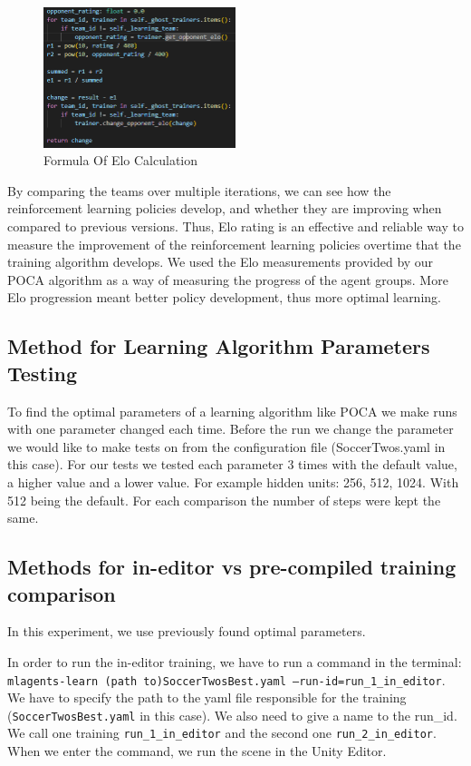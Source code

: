 \documentclass{LSkill}
\begin{document}
\begin{figure}[htbp]
    \centering
    \includegraphics[width=0.5\textwidth]{figure 1.png} 
    \caption{Formula Of Elo Calculation}
    \label{fig:Formula Of Elo Calculation}
\end{figure}
By comparing the teams over multiple iterations, we can see how the reinforcement learning policies develop, and whether they are improving when compared to previous versions. Thus, Elo rating is an effective and reliable way to measure the improvement of the reinforcement learning policies overtime that the training algorithm develops. 
We used the Elo measurements provided by our POCA algorithm as a way of measuring the progress of the agent groups. More Elo progression meant better policy development, thus more optimal learning. 



\subsection{Method for Learning Algorithm Parameters Testing}
To find the optimal parameters of a learning algorithm like POCA we make runs with one parameter changed each time. Before the run we change the parameter we would like to make tests on from the configuration file (SoccerTwos.yaml in this case). For our tests we tested each parameter 3 times with the default value, a higher value and a lower value. For example hidden units:  256,  512,  1024. With 512 being the default. For each comparison the number of steps were kept the same.

\subsection{Methods for in-editor vs pre-compiled training comparison}
In this experiment, we use previously found optimal parameters.

In order to run the in-editor training, we have to run a command in the terminal: 
\texttt{mlagents-learn (path to)SoccerTwosBest.yaml --run-id=run\_1\_in\_editor}. We have to specify the path to the yaml file responsible for the training (\texttt{SoccerTwosBest.yaml} in this case). We also need to give a name to the run\_id. We call one training \texttt{run\_1\_in\_editor} and the second one \texttt{run\_2\_in\_editor}. When we enter the command, we run the scene in the Unity Editor.
\end{document}
